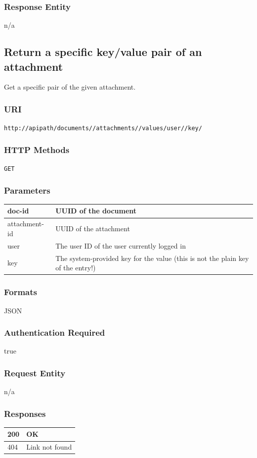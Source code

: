 \documentclass[10pt]{article}
\begin{document}
\subsubsection{Response Entity}
n/a
\subsection{Return a specific key/value pair of an attachment}
Get a specific pair of the given attachment.
\subsubsection{URI}
\texttt{http://apipath/documents//attachments//values/user//key/
}\subsubsection{HTTP Methods}
\texttt{GET}
\subsubsection{Parameters}
\begin{tabular}{|l|l|}\hline
doc-id & UUID of the document \\
\hline
attachment-id & UUID of the attachment \\
\hline
user & The user ID of the user currently logged in \\
\hline
key & The system-provided key for the value (this is not the plain key of the entry!) \\
\hline
\end{tabular}
\subsubsection{Formats}
JSON
\subsubsection{Authentication Required}
true
\subsubsection{Request Entity}
n/a
\subsubsection{Responses}
\begin{tabular}{|l|l|}\hline
200 & OK \\
\hline
404 & Link not found \\
\hline
\end{tabular}
\end{document}
